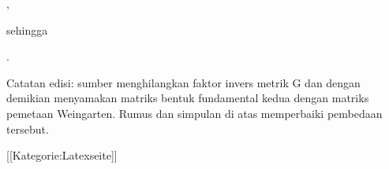 { { , }

sehingga

 { . }

Catatan edisi: sumber menghilangkan faktor invers metrik G dan dengan demikian menyamakan matriks bentuk fundamental kedua dengan matriks pemetaan Weingarten. Rumus dan simpulan di atas memperbaiki pembedaan tersebut.

}

 [[Kategorie:Latexseite]]

